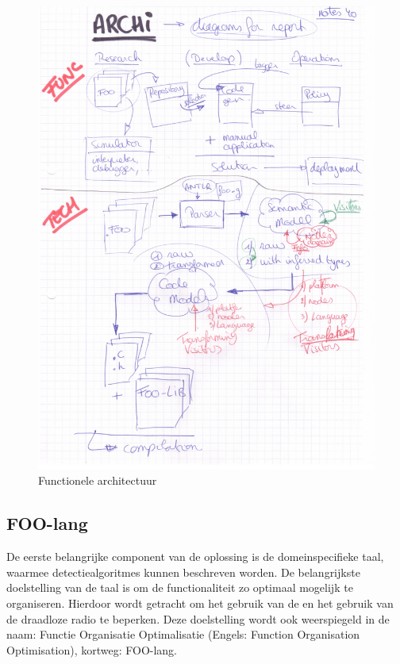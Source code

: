 \begin{figure}[ht]
  \centering
  \includegraphics[width=\linewidth]{resources/arch-functional.pdf}
  \caption{Functionele architectuur}
  \label{fig:arch-functional}
\end{figure}

\subsection{FOO-lang}
\label{subsection:arch-foo-lang}

De eerste belangrijke component van de oplossing is de domeinspecifieke taal,
waarmee detectiealgoritmes kunnen beschreven worden. De belangrijkste
doelstelling van de taal is om de functionaliteit zo optimaal mogelijk te
organiseren. Hierdoor wordt getracht om het gebruik van de \mcu en het gebruik
van de draadloze radio te beperken. Deze doelstelling wordt ook weerspiegeld in
de naam: Functie Organisatie Optimalisatie (Engels: Function Organisation
Optimisation), kortweg: FOO-lang.

